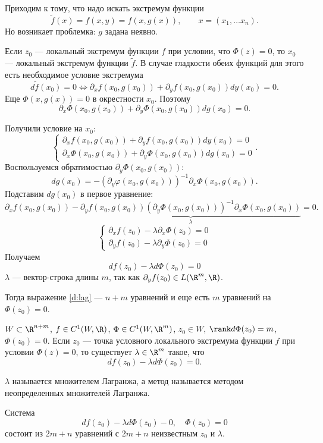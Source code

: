 Приходим к тому, что надо искать экстремум функции
\[
    \widetilde{   f }(x)= f(x, y) = f(x, g(x)), \qquad  x = (x_1, \ldots x_{n})
.\] 
Но возникает проблемка: $ g$ задана неявно.

Если  $ z_0$ --- локальный экстремум функции $ f$ при условии, что  $ \Phi(z) = 0$, то  $ x_0$ --- локальный экстремум функции $ \widetilde{f}$. В случае гладкости обеих функций для этого есть необходимое условие экстремума
  \[
	  d \widetilde{f}(x_0) = 0 \Longleftrightarrow \partial _x f(x_0, g(x_0)) + \partial _yf(x_0, g(x_0)) dy(x_0) = 0
 .\] 
 Еще $ \Phi(x, g(x)) = 0$ в окрестности $ x_0$. Поэтому 
 \[
     \partial _x \Phi(x_0, g(x_0)) + \partial _y\Phi(x_0, g(x_0))dg(x_0) = 0
 .\] 

 Получили условие на $ x_0$:
 \[
 \begin{cases}
	 \partial _x f(x_0, g(x_0)) + \partial _y f(x_0, g(x_0)) dy(x_0) = 0\\
	 \partial _x \Phi(x_0, g(x_0)) + \partial _y\Phi(x_0, g(x_0)) dg(x_0) = 0
 \end{cases}
 .\] 
 Воспользуемся обратимостью $ \partial _y \Phi(x_0, g(x_0))$:
 \[
	 dg(x_0) = - \left( \partial _y \varphi (x_0, g(x_0)) \right)^{-1} \partial _x \Phi(x_0, g(x_0))
 .\] 
 Подставим $ dg(x_0)$ в первое уравнение:
 \[
     \partial _x f(x_0, g(x_0)) - \underbrace{\partial _y f(x_0, g(x_0)) \left( \partial _y \Phi(x_0, g(x_0)) \right)^{-1} \partial _x \Phi (x_0, g(x_0))}_{\lambda} = 0
 .\] 
\[
\begin{cases}
	
    \partial _x f(z_0) - \lambda \partial _x \Phi(z_0) = 0 \\
    \partial _y f(z_0) - \lambda \partial _y \Phi(z_0) = 0
\end{cases}
\] 
Получаем 
\begin{equation}\label{d:lag}
    df(z_0) - \lambda d\Phi(z_0) = 0
\end{equation}
$ \lambda$ --- вектор-строка длины  $ m$, так как $ \partial _y f(z_0) \in  L(\R^{m} , \R)$.

Тогда выражение \ref{d:lag} --- $ n+m$ уравнений и еще есть $ m$ уравнений на $ \Phi(z_0) = 0$.
\begin{thm}
    $ W \subset \R^{n+m}$, 
	$ f \in C^{1}(W, \R)$,
	$ \Phi \in C^{1}(W, \R^{m})$,
	$ z_0 \in W$, 
	$ \rank d\Phi(z_0) = m$,
	$ \Phi(z_0) = 0$.  
	Если $ z_0$ --- точка условного локального экстремума функции $ f$ при условии  $ \Phi(z) = 0$,
	то существует  $ \lambda \in \R^{m}$ такое, что
    \[
	df(z_0) - \lambda d\Phi(z_0) = 0
    .\] 
\end{thm}
\begin{defn}
    $ \lambda$ называется {\sf множителем Лагранжа}, а метод называется {\sf методом неопределенных множителей Лагранжа}.    
\end{defn}
\begin{note}
    Система 
    \[
	df(z_0) - \lambda d\Phi(z_0) - 0, \quad \Phi(z_0) = 0
    \] 
    состоит из $ 2m+n$ уравнений с  $ 2m+n$ неизвестным $ z_0$ и $ \lambda$.
\end{note}
